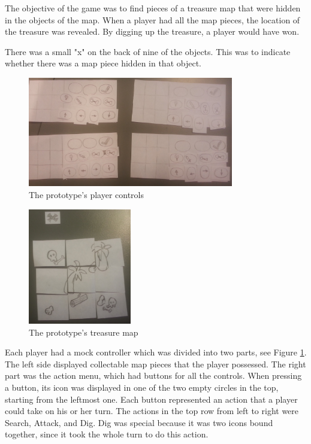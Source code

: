The objective of the game was to find pieces of a treasure map that were hidden in the objects of the map. When a player had all the map pieces, the location of the treasure was revealed. By digging up the treasure, a player would have won.


There was a small "x" on the back of nine of the objects. This was to indicate whether there was a map piece hidden in that object.

\begin{figure}[h]
\centering
\includegraphics[width=0.8\textwidth]{figures/PPtestControls}  
\caption{The prototype's player controls}\label{fig:PPtest2}
\end{figure}

\begin{figure}
\begin{center}
\includegraphics[width=0.4\textwidth]{figures/PPtestMap} 
\end{center}
\caption{The prototype's treasure map}\label{fig:PPtest3}
\end{figure}

Each player had a mock controller which was divided into two parts, see Figure \ref{fig:PPtest2}. The left side displayed collectable map pieces that the player possessed. The right part was the action menu, which had buttons for all the controls. When pressing a button, its icon was displayed in one of the two empty circles in the top, starting from the leftmost one. Each button represented an action that a player could take on his or her turn. The actions in the top row from left to right were Search, Attack, and Dig. Dig was special because it was two icons bound together, since it took the whole turn to do this action.

